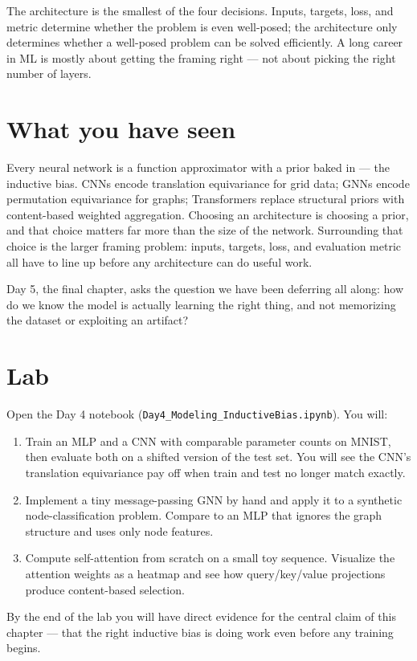 \begin{intuition}
The architecture is the smallest of the four decisions. Inputs, targets, loss, and metric determine whether the problem is even well-posed; the architecture only determines whether a well-posed problem can be solved efficiently. A long career in ML is mostly about getting the framing right --- not about picking the right number of layers.
\end{intuition}

\section{What you have seen}

Every neural network is a function approximator with a prior baked in --- the inductive bias. CNNs encode translation equivariance for grid data; GNNs encode permutation equivariance for graphs; Transformers replace structural priors with content-based weighted aggregation. Choosing an architecture is choosing a prior, and that choice matters far more than the size of the network. Surrounding that choice is the larger framing problem: inputs, targets, loss, and evaluation metric all have to line up before any architecture can do useful work.

Day 5, the final chapter, asks the question we have been deferring all along: how do we know the model is actually learning the right thing, and not memorizing the dataset or exploiting an artifact?

\section*{Lab}

Open the Day 4 notebook (\texttt{Day4\_Modeling\_InductiveBias.ipynb}). You will:

\begin{enumerate}
  \item Train an MLP and a CNN with comparable parameter counts on MNIST, then evaluate both on a shifted version of the test set. You will see the CNN's translation equivariance pay off when train and test no longer match exactly.
  \item Implement a tiny message-passing GNN by hand and apply it to a synthetic node-classification problem. Compare to an MLP that ignores the graph structure and uses only node features.
  \item Compute self-attention from scratch on a small toy sequence. Visualize the attention weights as a heatmap and see how query/key/value projections produce content-based selection.
\end{enumerate}

By the end of the lab you will have direct evidence for the central claim of this chapter --- that the right inductive bias is doing work even before any training begins.
